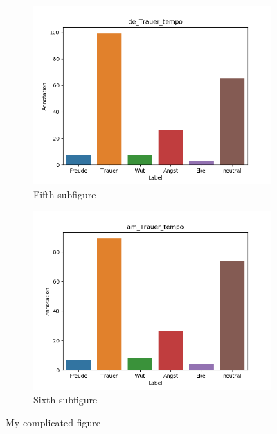 \documentclass[11pt,a4paper,headsepline,twoside,toc=bibliography]{scrreprt}
\begin{document}
\begin{figure}[t!]
	\medskip
	\begin{subfigure}{0.48\textwidth}
		\includegraphics[width=\linewidth]{plots/de_Trauer_tempo.png}
		\caption{Fifth subfigure} \label{fig:de_T_tempo}
	\end{subfigure}\hspace*{\fill}
	\begin{subfigure}{0.48\textwidth}
		\includegraphics[width=\linewidth]{plots/am_Trauer_tempo.png}
		\caption{Sixth subfigure} \label{fig:am__T_tempo}
	\end{subfigure}
	
	\caption{My complicated figure} \label{fig:countplots_T}
\end{figure}
\end{document}
